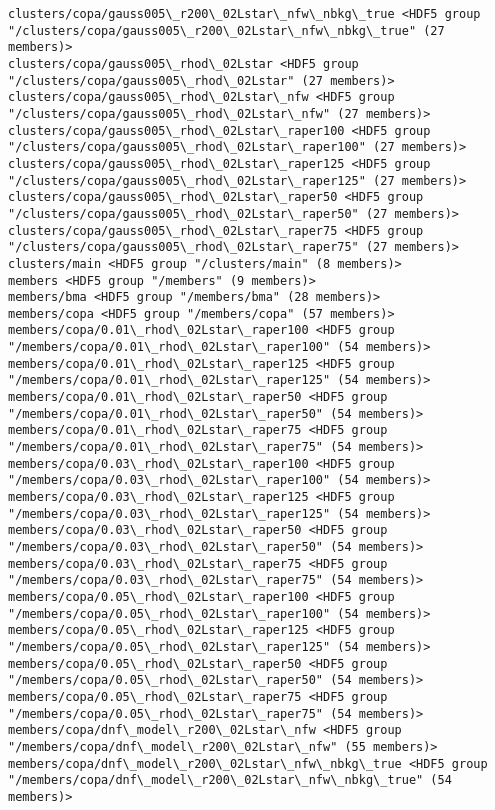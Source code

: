 \documentclass[11pt]{article}
\begin{document}
\begin{Verbatim}[commandchars=\\\{\}]
clusters/copa/gauss005\_r200\_02Lstar\_nfw\_nbkg\_true <HDF5 group "/clusters/copa/gauss005\_r200\_02Lstar\_nfw\_nbkg\_true" (27 members)>
clusters/copa/gauss005\_rhod\_02Lstar <HDF5 group "/clusters/copa/gauss005\_rhod\_02Lstar" (27 members)>
clusters/copa/gauss005\_rhod\_02Lstar\_nfw <HDF5 group "/clusters/copa/gauss005\_rhod\_02Lstar\_nfw" (27 members)>
clusters/copa/gauss005\_rhod\_02Lstar\_raper100 <HDF5 group "/clusters/copa/gauss005\_rhod\_02Lstar\_raper100" (27 members)>
clusters/copa/gauss005\_rhod\_02Lstar\_raper125 <HDF5 group "/clusters/copa/gauss005\_rhod\_02Lstar\_raper125" (27 members)>
clusters/copa/gauss005\_rhod\_02Lstar\_raper50 <HDF5 group "/clusters/copa/gauss005\_rhod\_02Lstar\_raper50" (27 members)>
clusters/copa/gauss005\_rhod\_02Lstar\_raper75 <HDF5 group "/clusters/copa/gauss005\_rhod\_02Lstar\_raper75" (27 members)>
clusters/main <HDF5 group "/clusters/main" (8 members)>
members <HDF5 group "/members" (9 members)>
members/bma <HDF5 group "/members/bma" (28 members)>
members/copa <HDF5 group "/members/copa" (57 members)>
members/copa/0.01\_rhod\_02Lstar\_raper100 <HDF5 group "/members/copa/0.01\_rhod\_02Lstar\_raper100" (54 members)>
members/copa/0.01\_rhod\_02Lstar\_raper125 <HDF5 group "/members/copa/0.01\_rhod\_02Lstar\_raper125" (54 members)>
members/copa/0.01\_rhod\_02Lstar\_raper50 <HDF5 group "/members/copa/0.01\_rhod\_02Lstar\_raper50" (54 members)>
members/copa/0.01\_rhod\_02Lstar\_raper75 <HDF5 group "/members/copa/0.01\_rhod\_02Lstar\_raper75" (54 members)>
members/copa/0.03\_rhod\_02Lstar\_raper100 <HDF5 group "/members/copa/0.03\_rhod\_02Lstar\_raper100" (54 members)>
members/copa/0.03\_rhod\_02Lstar\_raper125 <HDF5 group "/members/copa/0.03\_rhod\_02Lstar\_raper125" (54 members)>
members/copa/0.03\_rhod\_02Lstar\_raper50 <HDF5 group "/members/copa/0.03\_rhod\_02Lstar\_raper50" (54 members)>
members/copa/0.03\_rhod\_02Lstar\_raper75 <HDF5 group "/members/copa/0.03\_rhod\_02Lstar\_raper75" (54 members)>
members/copa/0.05\_rhod\_02Lstar\_raper100 <HDF5 group "/members/copa/0.05\_rhod\_02Lstar\_raper100" (54 members)>
members/copa/0.05\_rhod\_02Lstar\_raper125 <HDF5 group "/members/copa/0.05\_rhod\_02Lstar\_raper125" (54 members)>
members/copa/0.05\_rhod\_02Lstar\_raper50 <HDF5 group "/members/copa/0.05\_rhod\_02Lstar\_raper50" (54 members)>
members/copa/0.05\_rhod\_02Lstar\_raper75 <HDF5 group "/members/copa/0.05\_rhod\_02Lstar\_raper75" (54 members)>
members/copa/dnf\_model\_r200\_02Lstar\_nfw <HDF5 group "/members/copa/dnf\_model\_r200\_02Lstar\_nfw" (55 members)>
members/copa/dnf\_model\_r200\_02Lstar\_nfw\_nbkg\_true <HDF5 group "/members/copa/dnf\_model\_r200\_02Lstar\_nfw\_nbkg\_true" (54 members)>

\end{Verbatim}
\end{document}
